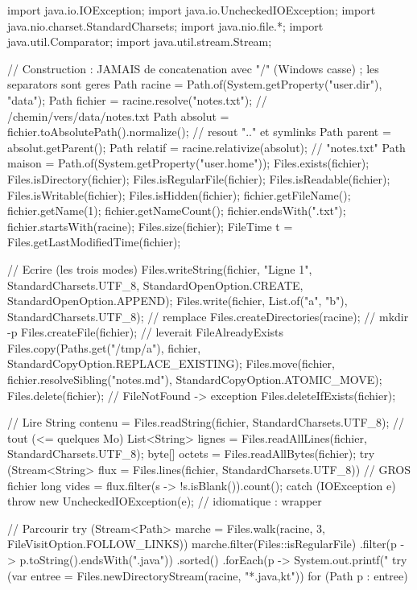 \begin{codejava}
import java.io.IOException;
import java.io.UncheckedIOException;
import java.nio.charset.StandardCharsets;
import java.nio.file.*;
import java.util.Comparator;
import java.util.stream.Stream;

// Construction : JAMAIS de concatenation avec "/" (Windows casse) ; les separators sont geres
Path racine = Path.of(System.getProperty("user.dir"), "data");
Path fichier = racine.resolve("notes.txt");            // /chemin/vers/data/notes.txt
Path absolut = fichier.toAbsolutePath().normalize();     // resout ".." et symlinks
Path parent = absolut.getParent();
Path relatif = racine.relativize(absolut);                // "notes.txt"
Path maison = Path.of(System.getProperty("user.home"));
Files.exists(fichier); Files.isDirectory(fichier); Files.isRegularFile(fichier);
Files.isReadable(fichier); Files.isWritable(fichier); Files.isHidden(fichier);
fichier.getFileName(); fichier.getName(1); fichier.getNameCount();
fichier.endsWith(".txt"); fichier.startsWith(racine);
Files.size(fichier);
FileTime t = Files.getLastModifiedTime(fichier);

// Ecrire (les trois modes)
Files.writeString(fichier, "Ligne 1\n", StandardCharsets.UTF_8,
        StandardOpenOption.CREATE, StandardOpenOption.APPEND);
Files.write(fichier, List.of("a", "b"), StandardCharsets.UTF_8);      // remplace
Files.createDirectories(racine);                                        // mkdir -p
Files.createFile(fichier);                                               // leverait FileAlreadyExists
Files.copy(Paths.get("/tmp/a"), fichier, StandardCopyOption.REPLACE_EXISTING);
Files.move(fichier, fichier.resolveSibling("notes.md"), StandardCopyOption.ATOMIC_MOVE);
Files.delete(fichier);                                                   // FileNotFound -> exception
Files.deleteIfExists(fichier);

// Lire
String contenu = Files.readString(fichier, StandardCharsets.UTF_8);   // tout (<= quelques Mo)
List<String> lignes = Files.readAllLines(fichier, StandardCharsets.UTF_8);
byte[] octets = Files.readAllBytes(fichier);
try (Stream<String> flux = Files.lines(fichier, StandardCharsets.UTF_8)) {   // GROS fichier
    long vides = flux.filter(s -> !s.isBlank()).count();
} catch (IOException e) { throw new UncheckedIOException(e); }              // idiomatique : wrapper

// Parcourir
try (Stream<Path> marche = Files.walk(racine, 3, FileVisitOption.FOLLOW_LINKS)) {
    marche.filter(Files::isRegularFile)
          .filter(p -> p.toString().endsWith(".java"))
          .sorted()
          .forEach(p -> System.out.printf("%
}
try (var entree = Files.newDirectoryStream(racine, "*.{java,kt}")) { for (Path p : entree) { } }


\end{codejava}
